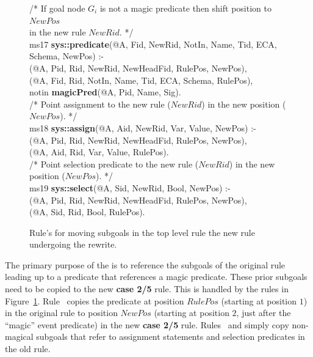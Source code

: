 \begin{figure}[!t]
\ssp
\centering
\begin{boxedminipage}{\linewidth}
/* If goal node $G_i$ is not a magic predicate then shift position to $NewPos$  \\
   in the new rule $NewRid$. */ \\
ms17 {\bf sys::predicate}(@A, Fid, NewRid, NotIn, Name, Tid, ECA, Schema, NewPos) :- \\
(@A, Pid, Rid, NewRid, NewHeadFid, RulePos, NewPos), \\
(@A, Fid, Rid, NotIn, Name, Tid, ECA, Schema, RulePos), \\
\datalogspace notin {\bf magicPred}(@A, Pid, Name, Sig). \\
	
/* Point assignment to the new rule ($NewRid$) in the new position ($NewPos$). */ \\
ms18 {\bf sys::assign}(@A, Aid, NewRid, Var, Value, NewPos) :- \\
(@A, Pid, Rid, NewRid, NewHeadFid, RulePos, NewPos), \\
(@A, Aid, Rid, Var, Value, RulePos). \\
	
/* Point selection predicate to the new rule ($NewRid$) in the new position ($NewPos$). */ \\
ms19 {\bf sys::select}(@A, Sid, NewRid, Bool, NewPos) :- \\
(@A, Pid, Rid, NewRid, NewHeadFid, RulePos, NewPos), \\
(@A, Sid, Rid, Bool, RulePos).

\end{boxedminipage}
\caption{\label{ch:magic:fig:rewrite3} Rule's for moving subgoals in the top level rule
the new rule undergoing the rewrite. }
\end{figure}

The primary purpose of the  is to reference the subgoals of the
original rule leading up to a predicate that references a magic predicate.
These prior subgoals need to be copied to the new {\bf case 2/5} rule.  This is
handled by the rules in Figure~\ref{ch:magic:fig:rewrite3}.  Rule~
copies the predicate at position $RulePos$ (starting at position $1$) in the
original rule to position $NewPos$ (starting at position $2$, just after the
``magic'' event predicate) in the new {\bf case 2/5} rule.  Rules~ and
 simply copy non-magical subgoals that refer to assignment statements
and selection predicates in the old rule.



